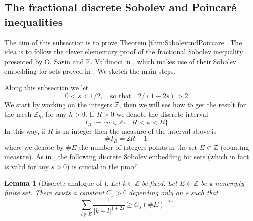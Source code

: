 \documentclass[a4paper,11pt,reqno]{amsart}
\newcommand{\Z}{\mathbb{Z}}
\newtheorem{lem}[thm]{Lemma}
\theoremstyle{definition}
\numberwithin{equation}{section}
\begin{document}
\subsection{The fractional discrete Sobolev and Poincar\'e inequalities}
\label{subsection:Sobolev}

The aim of this subsection is to prove Theorem \ref{thm:SobolevandPoincare}.
The idea is to follow the clever elementary proof of the fractional Sobolev inequality
presented by O. Savin and E. Valdinoci in \cite{Savin-Valdinoci-1},
which makes use of their Sobolev embedding for sets proved in \cite{Savin-Valdinoci-2}.
We sketch the main steps.

Along this subsection we let
$$
0<s<1/2,\quad\text{so that}\quad 2/(1-2s)>2.
$$
We start by working on the integers $\Z$, then we will see how to get
the result for the mesh $\Z_h$, for any $h>0$. If $R>0$ we denote the discrete interval
$$
I_R:=\{n\in\Z:-R<n<R\}.
$$
In this way, if $R$ is an integer then
the measure of the interval above is
\begin{equation}
\label{medida}
\#I_R=2R-1,
\end{equation}
where we denote by $\#E$ the number of integers points in the set $E\subset\Z$
(counting measure).
As in \cite{Savin-Valdinoci-1}, the following discrete Sobolev embedding for sets
(which in fact is valid for any $s>0$) is crucial in the proof.

\begin{lem}[{Discrete analogue of \cite[Lemma~A.1]{Savin-Valdinoci-2}}]\label{lem:1}
Let $k\in\Z$ be fixed. Let $E\subset\Z$ be a nonempty finite set. There exists a constant $C_s>0$
depending only on $s$ such that
$$
\sum_{l\notin E}\frac{1}{|k-l|^{1+2s}}\geq C_s(\#E)^{-2s}.
$$
\end{lem}
\end{document}
